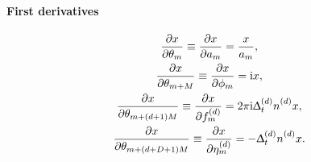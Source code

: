 \paragraph{First derivatives}
\begin{subequations}
    \begin{gather}
        \xderiv{\theta_m} \equiv
            \xderiv{a_m} =
            \frac{x}{a_m},
            \label{eq:deriv-a}\\
        \xderiv{\theta_{m + M}} \equiv
            \xderiv{\phi_m} =
            \iu x,\\
        \xderiv{\theta_{m + (d + 1)M}} \equiv
            \xderiv{\fdm} =
            2 \pi \iu \Dtd \nd x,\\
        \xderiv{\theta_{m + (d + D + 1)M}} \equiv
            \xderiv{\etadm} =
            - \Dtd \nd x.
    \end{gather}
    \label{eq:first-derivs}
\end{subequations}
